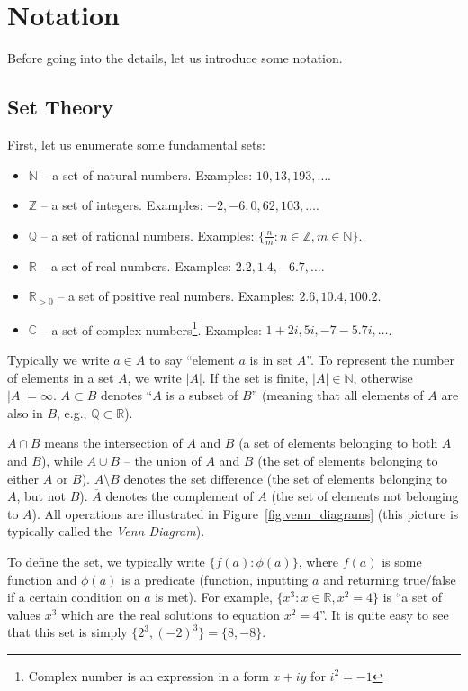 \documentclass[../lecture-notes.tex]{subfiles}
\begin{document}
\section{Notation}

Before going into the details, let us introduce some notation.

\subsection{Set Theory}
First, let us enumerate some fundamental sets:
\begin{itemize}
    \item $\mathbb{N}$ -- a set of natural numbers. Examples: $10, 13, 193, \dots$.
    \item $\mathbb{Z}$ -- a set of integers. Examples: $-2, -6, 0, 62, 103, \dots$.
    \item $\mathbb{Q}$ -- a set of rational numbers. Examples: $\{\frac{n}{m}: n \in \mathbb{Z}, m \in \mathbb{N}\}$.
    \item $\mathbb{R}$ -- a set of real numbers. Examples: $2.2, 1.4, -6.7, \dots$.
    \item $\mathbb{R}_{>0}$ -- a set of positive real numbers. Examples: $2.6, 10.4, 100.2$.
    \item $\mathbb{C}$ -- a set of complex numbers\footnote{Complex number is an expression in a form $x+iy$ for $i^2=-1$}. Examples: $1+2i, 5i, -7-5.7i, \dots$.
\end{itemize}

Typically we write $a \in A$ to say ``element $a$ is in set $A$''. To represent the number of elements in a set $A$, we write $|A|$. If the set is finite, $|A| \in \mathbb{N}$, otherwise 
$|A| = \infty$. $A \subset B$ denotes ``$A$ is a subset of $B$'' (meaning that all elements of $A$ are also in $B$, e.g., $\mathbb{Q} \subset \mathbb{R}$).

$A \cap B$ means the intersection of $A$ and $B$ (a set of elements belonging to both $A$ and $B$), while $A \cup B$ -- the union of $A$ and $B$ (the set of elements belonging to either $A$ or $B$). $A \setminus B$ denotes the set difference (the set of elements belonging to $A$, but not $B$). $\overline{A}$ denotes the complement of $A$ (the set of elements not belonging to $A$). All operations are illustrated in Figure~\ref{fig:venn_diagrams} (this picture is typically called the \textit{Venn Diagram}).

To define the set, we typically write $\{f(a): \phi(a)\}$, where $f(a)$ is some function and $\phi(a)$ is a predicate (function, inputting $a$ and returning true/false if a certain condition on $a$ is met). For example, $\{x^3: x \in \mathbb{R}, x^2 = 4\}$ is ``a set of values $x^3$ which are the real solutions to equation $x^2 = 4$''. It is quite easy to see that this set is simply $\{2^3, (-2)^3\} = \{8,-8\}$. 
\end{document}
